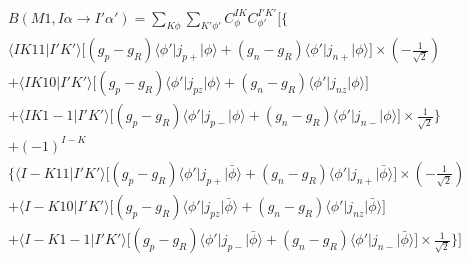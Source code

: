 \documentclass{article}
\begin{document}
\begin{equation*}
    \begin{aligned}
         & B(M1, I\alpha \rightarrow I'\alpha')
        = \sum_{K\phi} \sum_{K'\phi'} C_{\phi}^{IK} C_{\phi'}^{I'K'} \big[ \{                                        \\
         & \langle IK11 \big| I'K' \rangle \big[ (g_p - g_R) \langle \phi' \big| j_{p+} \big| \phi \rangle
        + (g_n - g_R) \langle \phi' \big| j_{n+} \big| \phi \rangle \big] \times (-\frac{1}{\sqrt{2}})               \\
         & + \langle IK10 \big| I'K' \rangle \big[ (g_p - g_R) \langle \phi' \big| j_{pz} \big| \phi \rangle
        + (g_n - g_R) \langle \phi' \big| j_{nz} \big| \phi \rangle \big]                                            \\
         & + \langle IK1-1 \big| I'K' \rangle \big[ (g_p - g_R) \langle \phi' \big| j_{p-} \big| \phi \rangle
        + (g_n - g_R) \langle \phi' \big| j_{n-} \big| \phi \rangle \big] \times \frac{1}{\sqrt{2}}\}                \\
         & + (-1)^{I-K}                                                                                              \\
         & \{ \langle I-K11 \big| I'K' \rangle \big[ (g_p - g_R) \langle \phi' \big| j_{p+} \big| \bar{\phi} \rangle
        + (g_n - g_R) \langle \phi' \big| j_{n+} \big| \bar{\phi} \rangle \big] \times (-\frac{1}{\sqrt{2}})         \\
         & + \langle I-K10 \big| I'K' \rangle \big[ (g_p - g_R) \langle \phi' \big| j_{pz} \big| \bar{\phi} \rangle
        + (g_n - g_R) \langle \phi' \big| j_{nz} \big| \bar{\phi} \rangle \big]                                      \\
         & + \langle I-K1-1 \big| I'K' \rangle \big[ (g_p - g_R) \langle \phi' \big| j_{p-} \big| \bar{\phi} \rangle
                + (g_n - g_R) \langle \phi' \big| j_{n-} \big| \bar{\phi} \rangle \big] \times \frac{1}{\sqrt{2}}\} \big]
    \end{aligned}
\end{equation*}
\end{document}
